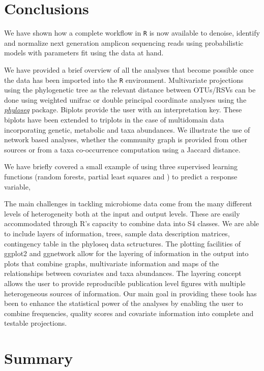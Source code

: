 \documentclass[9pt,a4paper]{extarticle}\usepackage[]{graphicx}\usepackage[]{color}
\makeatletter
\newcommand{\pkgname}[1]{\textit{#1}\xspace}
\newcommand{\CRANurl}[1]{\url{http://cran.r-project.org/package=#1}}
\def\CRANpkg{\@ifstar\@CRANpkg\@@CRANpkg}
\def\@CRANpkg#1{\href{http://cran.r-project.org/package=#1}{\pkgname{#1}}}
\def\@@CRANpkg#1{\href{http://cran.r-project.org/package=#1}{\pkgname{#1}}} %
\newcommand{\BioCpkg}[1]{\href{http://www.bioconductor.org/packages/release/bioc/html/#1.html}{\pkgname{#1}}}
\makeatother
\begin{document}
\section*{Conclusions} %
We have shown how a complete workflow in {\tt R} is now available to denoise, identify
and normalize next generation amplicon sequencing reads
using probabilistic models with parameters fit using the data at hand.

We have provided a brief overview of all the analyses that
become possible once the data has been imported into the {\tt R} environment.
Multivariate projections using the phylogenetic tree as the relevant distance between
OTUs/RSVs can be done using weighted unifrac or double principal coordinate analyses
using the \BioCpkg{phyloseq} package.
Biplots  provide the user with an interpretation key. These biplots have been extended
to triplots in the case of multidomain data incorporating genetic, metabolic and taxa abundances.
We illustrate the use of  network based analyses, whether the community graph is provided from other sources
or from a taxa co-occurrence computation using a Jaccard distance.

We have briefly covered a small example of using three
supervised learning functions (random forests, partial least squares and
) to predict a response variable,


The main challenges in tackling microbiome data come from the many
different levels of heterogeneity both at the input and output levels.
These are easily accommodated through R's capacity to combine data
into S4 classes. We are able to include layers of
information, trees, sample data description matrices, contingency table
in the phyloseq data sctructures. The plotting facilities of
\CRANpkg{ggplot2} and \CRANpkg{ggnetwork} allow for the layering of information in the output into
plots that combine graphs, multivariate information and maps of the relationships
between covariates and taxa abundances. The layering concept allows the user to provide
reproducible
publication level figures with multiple heterogeneous sources of information.
Our main goal in providing these tools has been to enhance the statistical power
of the analyses by enabling the user to combine frequencies, quality scores and
covariate information into complete and testable projections.

\section*{Summary}
\end{document}

